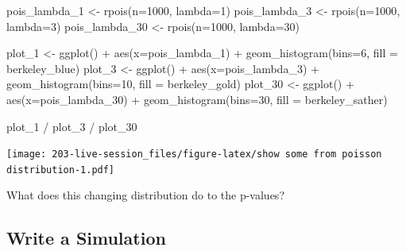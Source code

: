 \documentclass[
]{book}
\newenvironment{Shaded}{\begin{snugshade}}{\end{snugshade}}
\newcommand{\AttributeTok}[1]{\textcolor[rgb]{0.77,0.63,0.00}{#1}}
\newcommand{\DecValTok}[1]{\textcolor[rgb]{0.00,0.00,0.81}{#1}}
\newcommand{\FunctionTok}[1]{\textcolor[rgb]{0.00,0.00,0.00}{#1}}
\newcommand{\NormalTok}[1]{#1}
\newcommand{\OtherTok}[1]{\textcolor[rgb]{0.56,0.35,0.01}{#1}}
\newcommand{\SpecialCharTok}[1]{\textcolor[rgb]{0.00,0.00,0.00}{#1}}
\theoremstyle{definition}
\theoremstyle{definition}
\theoremstyle{definition}
\theoremstyle{definition}
\theoremstyle{remark}
\begin{document}
\begin{Shaded}
\begin{Highlighting}[]
\NormalTok{pois\_lambda\_1  }\OtherTok{\textless{}{-}} \FunctionTok{rpois}\NormalTok{(}\AttributeTok{n=}\DecValTok{1000}\NormalTok{, }\AttributeTok{lambda=}\DecValTok{1}\NormalTok{)}
\NormalTok{pois\_lambda\_3  }\OtherTok{\textless{}{-}} \FunctionTok{rpois}\NormalTok{(}\AttributeTok{n=}\DecValTok{1000}\NormalTok{, }\AttributeTok{lambda=}\DecValTok{3}\NormalTok{)}
\NormalTok{pois\_lambda\_30 }\OtherTok{\textless{}{-}} \FunctionTok{rpois}\NormalTok{(}\AttributeTok{n=}\DecValTok{1000}\NormalTok{, }\AttributeTok{lambda=}\DecValTok{30}\NormalTok{)}

\NormalTok{plot\_1  }\OtherTok{\textless{}{-}} \FunctionTok{ggplot}\NormalTok{() }\SpecialCharTok{+} \FunctionTok{aes}\NormalTok{(}\AttributeTok{x=}\NormalTok{pois\_lambda\_1) }\SpecialCharTok{+} \FunctionTok{geom\_histogram}\NormalTok{(}\AttributeTok{bins=}\DecValTok{6}\NormalTok{, }\AttributeTok{fill =}\NormalTok{ berkeley\_blue)}
\NormalTok{plot\_3  }\OtherTok{\textless{}{-}} \FunctionTok{ggplot}\NormalTok{() }\SpecialCharTok{+} \FunctionTok{aes}\NormalTok{(}\AttributeTok{x=}\NormalTok{pois\_lambda\_3) }\SpecialCharTok{+} \FunctionTok{geom\_histogram}\NormalTok{(}\AttributeTok{bins=}\DecValTok{10}\NormalTok{, }\AttributeTok{fill =}\NormalTok{ berkeley\_gold)}
\NormalTok{plot\_30 }\OtherTok{\textless{}{-}} \FunctionTok{ggplot}\NormalTok{() }\SpecialCharTok{+} \FunctionTok{aes}\NormalTok{(}\AttributeTok{x=}\NormalTok{pois\_lambda\_30) }\SpecialCharTok{+} \FunctionTok{geom\_histogram}\NormalTok{(}\AttributeTok{bins=}\DecValTok{30}\NormalTok{, }\AttributeTok{fill =}\NormalTok{ berkeley\_sather)}

\NormalTok{plot\_1 }\SpecialCharTok{/}\NormalTok{ plot\_3 }\SpecialCharTok{/}\NormalTok{ plot\_30}
\end{Highlighting}
\end{Shaded}

\texttt{[image: 203-live-session\_files/figure-latex/show some from poisson distribution-1.pdf]}

What does this changing distribution do to the p-values?

\hypertarget{write-a-simulation}{%
\subsection{Write a Simulation}\label{write-a-simulation}}
\end{document}
